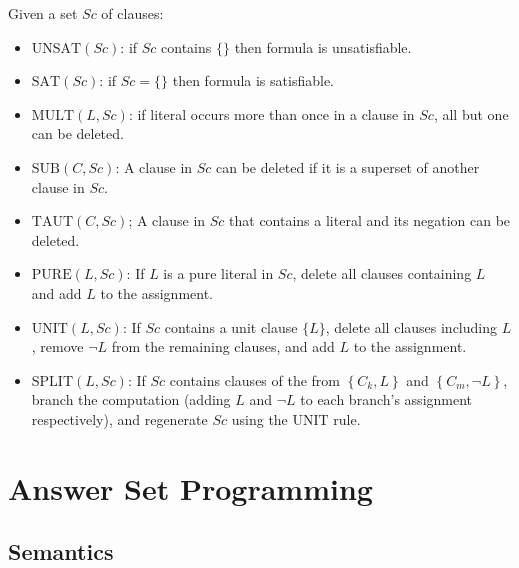 \documentclass[twocolumn,english]{article}
\begin{document}
Given a set $Sc$ of clauses:
\begin{itemize}
\item $\text{UNSAT}\left(Sc\right)$: if $Sc$ contains $\{\}$ then formula
is unsatisfiable.
\item $\text{SAT}\left(Sc\right)$: if $Sc=\{\}$ then formula is satisfiable.
\item $\text{MULT}\left(L,Sc\right)$: if literal occurs more than once
in a clause in $Sc$, all but one can be deleted.
\item $\text{SUB}\left(C,Sc\right)$: A clause in $Sc$ can be deleted if
it is a superset of another clause in $Sc$.
\item $\text{TAUT}\left(C,Sc\right)$; A clause in $Sc$ that contains a
literal and its negation can be deleted.
\item $\text{PURE}\left(L,Sc\right)$: If $L$ is a pure literal in $Sc$,
delete all clauses containing $L$ and add $L$ to the assignment.
\item $\text{UNIT}\left(L,Sc\right)$: If $Sc$ contains a unit clause $\{L\}$,
delete all clauses including $L$, remove $\lnot L$ from the remaining
clauses, and add $L$ to the assignment.
\item $\text{SPLIT}\left(L,Sc\right)$: If $Sc$ contains clauses of the
from $\left\{ C_{k},L\right\} $ and $\left\{ C_{m},\lnot L\right\} $,
branch the computation (adding $L$ and $\lnot L$ to each branch's
assignment respectively), and regenerate $Sc$ using the UNIT rule.
\end{itemize}

\section{Answer Set Programming}

\subsection{Semantics}
\end{document}
